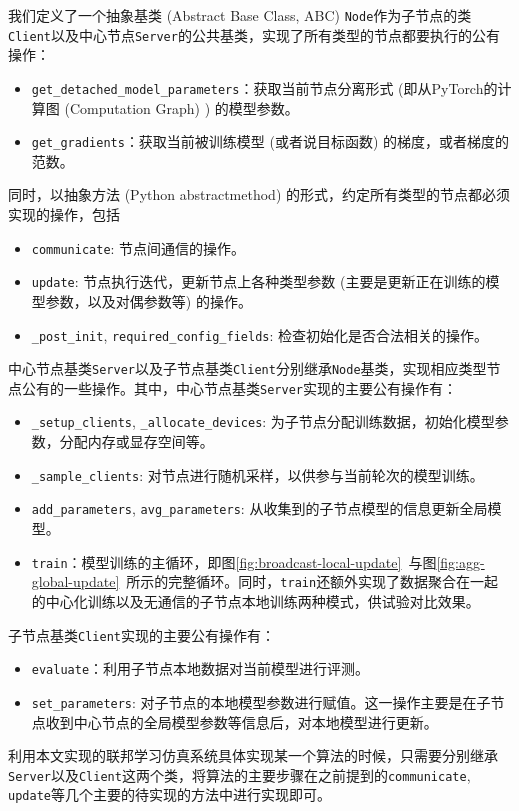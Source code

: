 我们定义了一个抽象基类 (Abstract Base Class, ABC) \texttt{Node}作为子节点的类\texttt{Client}以及中心节点\texttt{Server}的公共基类，实现了所有类型的节点都要执行的公有操作：
\begin{itemize}
    \item \texttt{get\_detached\_model\_parameters}：获取当前节点分离形式 (即从PyTorch的计算图 (Computation Graph) ) 的模型参数。
    \item \texttt{get\_gradients}：获取当前被训练模型 (或者说目标函数) 的梯度，或者梯度的范数。
\end{itemize}
同时，以抽象方法 (Python abstractmethod) 的形式，约定所有类型的节点都必须实现的操作，包括
\begin{itemize}
    \item \texttt{communicate}: 节点间通信的操作。
    \item \texttt{update}: 节点执行迭代，更新节点上各种类型参数 (主要是更新正在训练的模型参数，以及对偶参数等) 的操作。
    \item \texttt{\_post\_init}, \texttt{required\_config\_fields}: 检查初始化是否合法相关的操作。
\end{itemize}

中心节点基类\texttt{Server}以及子节点基类\texttt{Client}分别继承\texttt{Node}基类，实现相应类型节点公有的一些操作。其中，中心节点基类\texttt{Server}实现的主要公有操作有：
\begin{itemize}
    \item \texttt{\_setup\_clients}, \texttt{\_allocate\_devices}: 为子节点分配训练数据，初始化模型参数，分配内存或显存空间等。
    \item \texttt{\_sample\_clients}: 对节点进行随机采样，以供参与当前轮次的模型训练。
    \item \texttt{add\_parameters}, \texttt{avg\_parameters}: 从收集到的子节点模型的信息更新全局模型。
    \item \texttt{train}：模型训练的主循环，即图\ref{fig:broadcast-local-update}~与图\ref{fig:agg-global-update}~所示的完整循环。同时，\texttt{train}还额外实现了数据聚合在一起的中心化训练以及无通信的子节点本地训练两种模式，供试验对比效果。
\end{itemize}
子节点基类\texttt{Client}实现的主要公有操作有：
\begin{itemize}
    \item \texttt{evaluate}：利用子节点本地数据对当前模型进行评测。
    \item \texttt{set\_parameters}: 对子节点的本地模型参数进行赋值。这一操作主要是在子节点收到中心节点的全局模型参数等信息后，对本地模型进行更新。
\end{itemize}
利用本文实现的联邦学习仿真系统具体实现某一个算法的时候，只需要分别继承\texttt{Server}以及\texttt{Client}这两个类，将算法的主要步骤在之前提到的\texttt{communicate}, \texttt{update}等几个主要的待实现的方法中进行实现即可。

